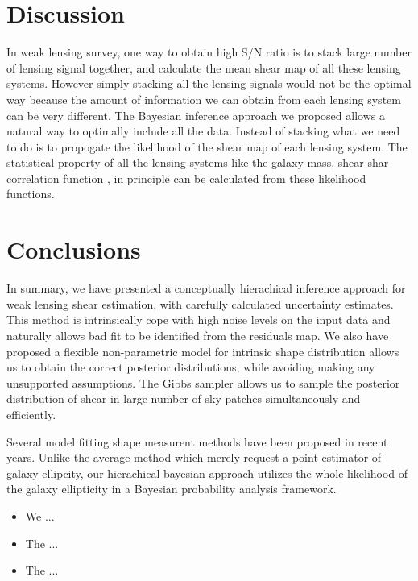 \documentclass[useAMS,usenatbib]{mn2e}
\begin{document}



\section{Discussion}

\label{sec:XXX} In weak lensing survey, one way to obtain high S/N
ratio is to stack large number of lensing signal together, and calculate
the mean shear map of all these lensing systems. However simply 
stacking all the lensing signals would not be the optimal way because
the amount of information we can obtain from each lensing system
can be very different. The Bayesian inference approach we proposed
allows a natural way to optimally include all the data. Instead of
stacking what we need to do is to propogate the likelihood of the
shear map of each lensing system. The statistical property of all
the lensing systems like the galaxy-mass, shear-shar correlation function
, in principle can be calculated from these likelihood functions.






\section{Conclusions}

\label{sec:conclusions}

In summary, we have presented a conceptually hierachical inference
approach for weak lensing shear estimation, with carefully calculated 
uncertainty estimates. This method is intrinsically cope with high noise
levels on the input data and naturally allows bad fit to be identified 
from the residuals map. We also have proposed a flexible non-parametric model 
for intrinsic shape distribution allows us to obtain the correct posterior 
distributions, while avoiding making any unsupported assumptions. The Gibbs
sampler allows us to sample the posterior distribution of shear in large number of
sky patches simultaneously and efficiently.

Several  model fitting  shape measurent methods have been proposed in recent years.
Unlike the average method which merely request a point estimator of galaxy ellipcity, our 
hierachical bayesian approach utilizes the whole likelihood of the galaxy ellipticity in a Bayesian probability analysis framework.
\begin{itemize}
\item We ...
\item The ...
\item The ...
\end{itemize}
\end{document}
